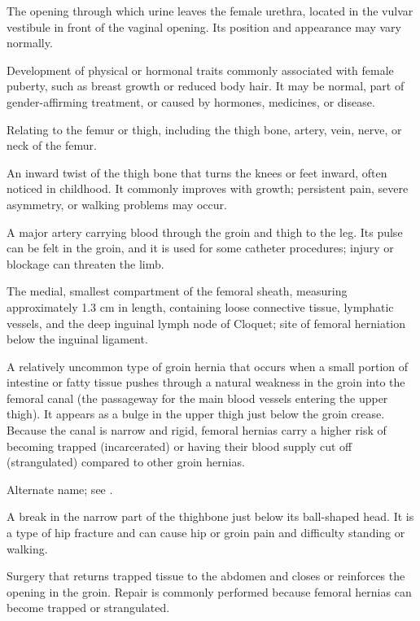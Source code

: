  The opening through which urine leaves the female urethra, located in the vulvar vestibule in front of the vaginal opening. Its position and appearance may vary normally.

 Development of physical or hormonal traits commonly associated with female puberty, such as breast growth or reduced body hair. It may be normal, part of gender-affirming treatment, or caused by hormones, medicines, or disease.

 Relating to the femur or thigh, including the thigh bone, artery, vein, nerve, or neck of the femur.

 An inward twist of the thigh bone that turns the knees or feet inward, often noticed in childhood. It commonly improves with growth; persistent pain, severe asymmetry, or walking problems may occur.

 A major artery carrying blood through the groin and thigh to the leg. Its pulse can be felt in the groin, and it is used for some catheter procedures; injury or blockage can threaten the limb.

 The medial, smallest compartment of the femoral sheath, measuring approximately 1.3 cm in length, containing loose connective tissue, lymphatic vessels, and the deep inguinal lymph node of Cloquet; site of femoral herniation below the inguinal ligament.

 A relatively uncommon type of groin hernia that occurs when a small portion of intestine or fatty tissue pushes through a natural weakness in the groin into the femoral canal (the passageway for the main blood vessels entering the upper thigh). It appears as a bulge in the upper thigh just below the groin crease. Because the canal is narrow and rigid, femoral hernias carry a higher risk of becoming trapped (incarcerated) or having their blood supply cut off (strangulated) compared to other groin hernias.

 Alternate name; see .

 A break in the narrow part of the thighbone just below its ball-shaped head. It is a type of hip fracture and can cause hip or groin pain and difficulty standing or walking.

 Surgery that returns trapped tissue to the abdomen and closes or reinforces the opening in the groin. Repair is commonly performed because femoral hernias can become trapped or strangulated.

